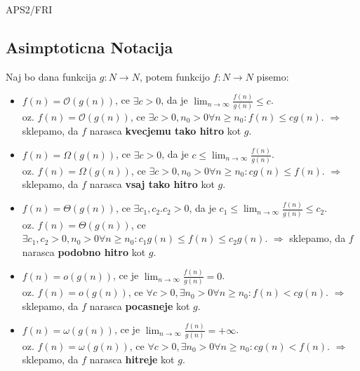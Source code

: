 \documentclass{article}
\begin{document}
\begin{center}
	{\small APS2/FRI \par}
\end{center}


\begin{multicols}{2}

	\section{Asimptoticna Notacija}

	Naj bo dana funkcija $g: N \rightarrow N$, potem funkcijo $f: N \rightarrow N$ pisemo:
	\begin{itemize}
		\item $f(n) = \mathcal{O}(g(n))$, ce $\exists c > 0$, da je $\lim_{n \rightarrow \infty} \frac{f(n)}{g(n)} \leq c$.\\
		      oz. $f(n) = \mathcal{O}(g(n))$, ce $\exists c > 0, n_0 > 0  \forall n \geq n_0: f(n) \leq cg(n)$. $\Rightarrow$
		      sklepamo, da $f$ narasca \textbf{kvecjemu tako hitro} kot $g$.
		\item $f(n) = \Omega(g(n))$, ce $\exists c > 0$, da je $c \leq \lim_{n \rightarrow \infty} \frac{f(n)}{g(n)}$.\\
		      oz. $f(n) = \Omega(g(n))$, ce $\exists c > 0, n_0 > 0  \forall n \geq n_0: cg(n) \leq f(n)$. $\Rightarrow$
		      sklepamo, da $f$ narasca \textbf{vsaj tako hitro} kot $g$.
		\item $f(n) = \Theta(g(n))$, ce $\exists c_1, c_2. c_2 > 0$, da je $c_1 \leq \lim_{n \rightarrow \infty} \frac{f(n)}{g(n)} \leq c_2$.\\
		      oz. $f(n) = \Theta(g(n))$, ce $\exists c_1, c_2 > 0, n_0 > 0  \forall n \geq n_0: c_1 g(n) \leq f(n) \leq c_2 g(n)$. $\Rightarrow$
		      sklepamo, da $f$ narasca \textbf{podobno hitro} kot $g$.
		\item $f(n) = o(g(n))$, ce je $\lim_{n \rightarrow \infty} \frac{f(n)}{g(n)} = 0$.\\
		      oz. $f(n) = o(g(n))$, ce $\forall c > 0, \exists n_0 > 0  \forall n \geq n_0: f(n) < cg(n)$. $\Rightarrow$
		      sklepamo, da $f$ narasca \textbf{pocasneje} kot $g$.
		\item $f(n) = \omega(g(n))$, ce  je $ \lim_{n \rightarrow \infty} \frac{f(n)}{g(n)} = + \infty$.\\
		      oz. $f(n) = \omega(g(n))$, ce $\forall c > 0, \exists n_0 > 0  \forall n \geq n_0: cg(n) < f(n)$. $\Rightarrow$
		      sklepamo, da $f$ narasca \textbf{hitreje} kot $g$.
	\end{itemize}


\end{multicols}
\end{document}
